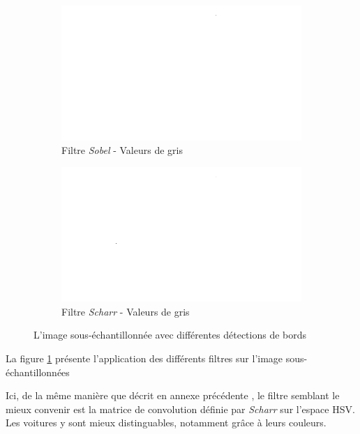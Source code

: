 \begin{appendix}
\begin{figure}[H]
    \bigskip
    \begin{subfigure}{.5\textwidth}
        \centering
        \includegraphics[width=.85\linewidth]{img/conception/image_process/downsample-edge/2.png}
        \caption{Filtre \textit{Sobel} - Valeurs de gris}
    \end{subfigure}%
    \begin{subfigure}{.5\textwidth}
        \centering
        \includegraphics[width=.85\linewidth]{img/conception/image_process/downsample-edge/5.png}
        \caption{Filtre \textit{Scharr} - Valeurs de gris}
    \end{subfigure}%
    \centering
    \caption{L'image sous-échantillonnée avec différentes détections de bords}
    \label{fig:image_process_down_edge}
\end{figure}

La figure \ref{fig:image_process_down_edge} présente l'application des différents filtres sur l'image sous-échantillonnées

Ici, de la même manière que décrit en annexe précédente , le filtre semblant le mieux convenir est la matrice de convolution définie par \textit{Scharr} sur l'espace HSV. Les voitures y sont mieux distinguables, notamment grâce à leurs couleurs.


\end{appendix}
